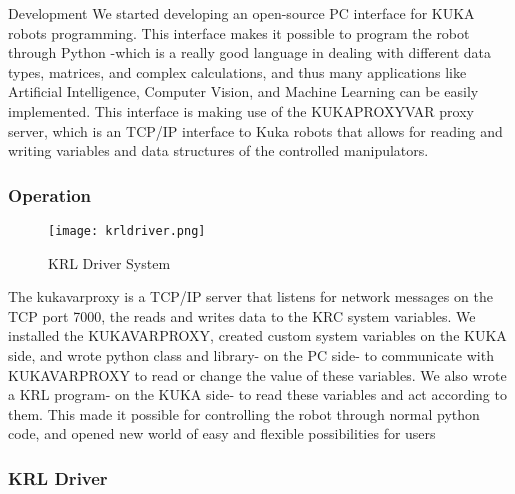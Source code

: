 \documentclass[a4paper]{book}
\begin{document}
\begin{chapter}{Development}
We started developing an open-source PC interface for KUKA robots programming. This interface makes it possible to program the robot through Python -which is a really good language in dealing with different data types, matrices, and complex calculations, and thus many applications like Artificial Intelligence, Computer Vision, and Machine Learning can be easily implemented. 
This interface is making use of the KUKAPROXYVAR proxy server, which is an TCP/IP interface to Kuka robots that allows for reading and writing variables and data structures of the controlled manipulators.
 
\subsubsection{Operation}
\begin{figure}[H]
	\centering
	\caption{KRL Driver System}
	\texttt{[image: krldriver.png]}
	\end{figure}
	The kukavarproxy is a TCP/IP server that listens for network messages on the TCP port 7000, the reads and writes data to the KRC system variables.
	We installed the KUKAVARPROXY, created custom system variables on the KUKA side, and wrote python class and library- on the PC side- to communicate with KUKAVARPROXY to read or change the value of these variables. We also wrote a KRL program- on the KUKA side- to read these variables and act according to them. This made it possible for controlling the robot through normal python code, and opened new world of easy and flexible possibilities for users

\subsubsection{KRL Driver}

\end{chapter}
\end{document}

